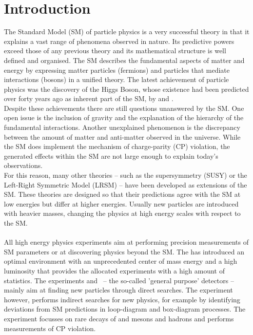 \chapter{Introduction}
\label{Chapter0}
The Standard Model (SM) of particle physics is a very successful theory in that it explains a vast range of phenomena observed in nature. Its predictive powers exceed those of any previous theory and its mathematical structure is well defined and organised. The SM describes the fundamental aspects of matter and energy by expressing matter particles (fermions) and particles that mediate interactions (bosons) in a unified theory. The latest achievement of particle physics was the discovery of the Higgs Boson, whose existence had been predicted over forty years ago as inherent part of the SM, by \cms \cite{higgscms} and \atlas \cite{higgsatlas}.\\ 
Despite these achievements there are still questions unanswered by the SM. One open issue is the inclusion of gravity and the explanation of the hierarchy of the fundamental interactions. Another unexplained phenomenon is the discrepancy between the amount of matter and anti-matter observed in the universe. While the SM does implement the mechanism of charge-parity (CP) violation, the generated effects within the SM are not large enough to explain today's observations.\\
For this reason, many other theories -- such as the supersymmetry (SUSY) or the Left-Right Symmetric Model (LRSM) -- have been developed as extensions of the SM. These theories are designed so that their predictions agree with the SM at low energies but differ at higher energies. Usually new particles are introduced with heavier masses, changing the physics at high energy scales with respect to the SM.\\
\\
All high energy physics experiments aim at performing precision measurements of SM parameters or at discovering physics beyond the SM. The \lhc has introduced an optimal environment with an unprecedented center of mass energy and a high luminosity that provides the allocated experiments with a high amount of statistics. The experiments \atlas and \cms \ -- the so-called 'general purpose' detectors -- mainly aim at finding new particles through direct searches. The \lhcb experiment however, performs indirect searches for new physics, for example by identifying deviations from SM predictions in loop-diagram and box-diagram processes. The \lhcb experiment focusses on rare decays of \B and \D mesons and hadrons and performs measurements of CP violation.\\
